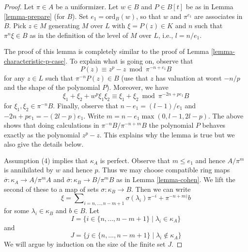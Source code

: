 \begin{proof}
Let $\pi \in A$ be a uniformizer.
Let $w \in B$ and $P \in B[t]$ be as in Lemma \ref{lemma-prepare} (for $B$).
Set $e_1 = \text{ord}_B(w)$, so that $w$ and $\pi^{e_1}$ are associates in $B$.
Pick $z \in M$ generating $M$ over $L$ with $\xi = P(z) \in K$
and $n$ such that $\pi^n\xi \in B$ as in the definition of the level
of $M$ over $L$, i.e., $l = n/e_1$.

\medskip\noindent
The proof of this lemma is completely similar to the proof of
Lemma \ref{lemma-characteristic-p-case}.
To explain what is going on, observe that
\begin{equation}
\label{equation-first-congruence}
P(z) \equiv z^p - z \bmod \pi^{-n + e_1}B
\end{equation}
for any $z \in L$ such that $\pi^{-n} P(z) \in B$ (use that $z$ has valuation
at worst $-n/p$ and the shape of the polynomial $P$). Moreover, we have
\begin{equation}
\label{equation-second-congruence}
\xi_1 + \xi_2 + w^p \xi_1 \xi_2 \equiv \xi_1 + \xi_2 \bmod \pi^{-2n + pe_1}B 
\end{equation}
for $\xi_1, \xi_2 \in \pi^{-n}B$. Finally, observe that
$n - e_1 = (l - 1)/e_1$ and $-2n + pe_1 = -(2l - p)e_1$.
Write $m = n - e_1 \max(0, l - 1, 2l - p)$. The above shows that doing
calculations in $\pi^{-n}B / \pi^{-n + m}B$ the polynomial $P$ behaves exactly
as the polynomial $z^p -  z$. This explains why the lemma is true
but we also give the details below.

\medskip\noindent
Assumption (4) implies that $\kappa_A$ is perfect. Observe that
$m \leq e_1$ and hence $A/\pi^m$ is annihilated by $w$ and hence $p$.
Thus we may choose compatible ring maps
$\overline{\sigma} : \kappa_A \to A/\pi^mA$ and
$\overline{\sigma} : \kappa_B \to B/\pi^mB$ as in
Lemma \ref{lemma-cohen}. We lift the second of these to a
map of sets $\sigma : \kappa_B \to B$. Then we can write
$$
\xi =
\sum\nolimits_{i = n, \ldots, n - m + 1} \sigma(\lambda_i) \pi^{-i} +
\pi^{-n + m)} b
$$
for some $\lambda_i \in \kappa_B$ and $b \in B$. Let
$$
I = \{i \in \{n, \ldots, n - m + 1\} \mid \lambda_i \in \kappa_A\}
$$
and
$$
J = \{j \in \{n, \ldots, n - m + 1\} \mid \lambda_i \not \in \kappa_A\}
$$
We will argue by induction on the size of the finite set $J$.


\end{proof}
